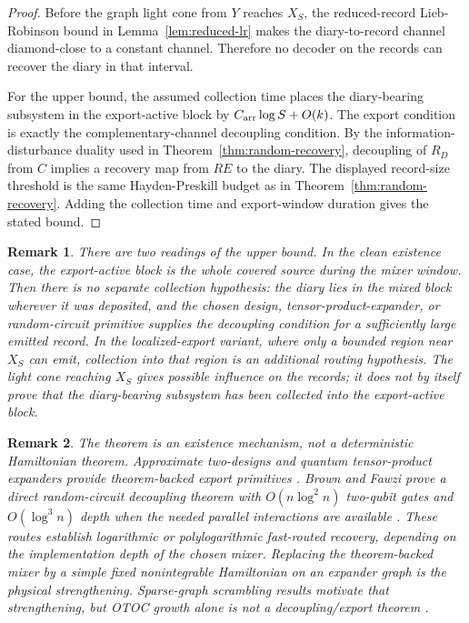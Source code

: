 \documentclass[11pt]{article}
\newtheorem{remark}{Remark}
\begin{document}
\begin{proof}
Before the graph light cone from $Y$ reaches $X_S$, the reduced-record
Lieb-Robinson bound in Lemma~\ref{lem:reduced-lr} makes the diary-to-record
channel diamond-close to a constant channel.  Therefore no decoder on
the records can recover the diary in that interval.

For the upper bound, the assumed collection time places the
diary-bearing subsystem in the export-active block by
$C_{\rm arr}\log S+O(k)$.  The export condition is exactly the
complementary-channel decoupling condition.  By the
information-disturbance duality used in Theorem~\ref{thm:random-recovery},
decoupling of $R_D$ from $C$ implies a recovery map from $RE$ to the
diary.  The displayed record-size threshold is the same
Hayden-Preskill budget as in Theorem~\ref{thm:random-recovery}.  Adding
the collection time and export-window duration gives the stated bound.
\end{proof}

\begin{remark}
There are two readings of the upper bound.  In the clean existence
case, the export-active block is the whole covered source during the
mixer window.  Then there is no separate collection hypothesis: the
diary lies in the mixed block wherever it was deposited, and the
chosen design, tensor-product-expander, or random-circuit primitive
supplies the decoupling condition for a sufficiently large emitted
record.  In the localized-export
variant, where only a bounded region near $X_S$ can emit, collection into
that region is an additional routing hypothesis.  The light cone reaching
$X_S$ gives possible influence on the records; it does not by itself
prove that the diary-bearing subsystem has been collected into the
export-active block.
\end{remark}

\begin{remark}
The theorem is an existence mechanism, not a deterministic Hamiltonian
theorem.  Approximate two-designs and quantum tensor-product expanders
provide theorem-backed export primitives
\citep{Harrow2009RandomCircuits,Harrow2009TPE,Szehr2013Decoupling}.
Brown and Fawzi prove a direct random-circuit decoupling theorem with
$O(n\log^2 n)$ two-qubit gates and $O(\log^3 n)$ depth when the needed
parallel interactions are available \citep{Brown2015Decoupling}.  These
routes establish logarithmic or polylogarithmic fast-routed recovery,
depending on the implementation depth of the chosen mixer.  Replacing
the theorem-backed mixer by a simple fixed nonintegrable Hamiltonian on
an expander graph is the physical strengthening.  Sparse-graph
scrambling results motivate that strengthening, but OTOC growth alone is
not a decoupling/export theorem \citep{Barbon2012Expanders,
Bentsen2019Sparse}.
\end{remark}
\end{document}
